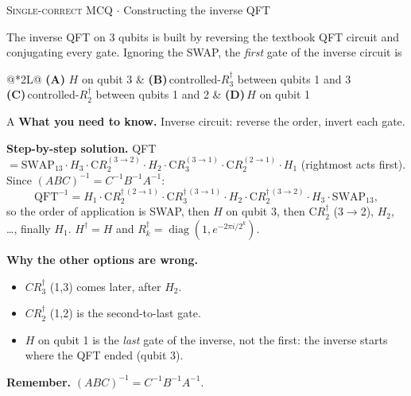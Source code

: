 \documentclass[11pt,a4paper]{article}
\newcommand{\optlabel}[1]{\textbf{(#1)}}
\newcommand{\correctlabel}[1]{\textcolor{okgreen}{\textbf{(#1)}\,\ding{51}}}
\newenvironment{qitem}[1]{\begin{list}{}{\setlength{\leftmargin}{3.3em}\setlength{\labelwidth}{3.1em}%
  \setlength{\labelsep}{0.2em}\setlength{\topsep}{3pt}\setlength{\parsep}{3pt}}\item[\textbf{Q.#1}\hfill]}{\end{list}}
\newcommand{\qsep}{\par\vspace{2pt}{\color{black!15}\hrule}\vspace{4pt}}
\newcommand{\qmeta}[2]{{\footnotesize\color{black!60}\textsc{#1} \;$\cdot$\; #2}\par}
\begin{document}
\begin{qitem}{51}
\qmeta{Single-correct MCQ}{Constructing the inverse QFT}
The inverse QFT on 3 qubits is built by reversing the textbook QFT circuit and conjugating every gate. Ignoring the
SWAP, the \emph{first} gate of the inverse circuit is
\par\smallskip\noindent\begin{tabularx}{\linewidth}{@{}*{2}{L}@{}}
\correctlabel{A}\,$H$ on qubit 3 & \optlabel{B}\,controlled-$R_3^\dagger$ between qubits 1 and 3 \\[3pt]
\optlabel{C}\,controlled-$R_2^\dagger$ between qubits 1 and 2 & \optlabel{D}\,$H$ on qubit 1
\end{tabularx}
\end{qitem}
\begin{solbox}{A}
\textbf{\color{brand}What you need to know.} Inverse circuit: reverse the order, invert each gate.

\textbf{\color{brand}Step-by-step solution.} QFT $= \mathrm{SWAP}_{13}\cdot H_3\cdot \mathrm{C}R_2^{(3\to2)}\cdot H_2\cdot\mathrm{C}R_3^{(3\to1)}\cdot \mathrm{C}R_2^{(2\to1)}\cdot H_1$
(rightmost acts first). Since $(ABC)^{-1} = C^{-1}B^{-1}A^{-1}$:
\[ \mathrm{QFT}^{-1} = H_1\cdot \mathrm{C}R_2^{\dagger\,(2\to1)}\cdot\mathrm{C}R_3^{\dagger\,(3\to1)}\cdot H_2\cdot \mathrm{C}R_2^{\dagger\,(3\to2)}\cdot H_3\cdot \mathrm{SWAP}_{13}, \]
so the order of application is SWAP, then $H$ on qubit 3, then $\mathrm{C}R_2^\dagger$ (3$\to$2), $H_2$, \dots, finally $H_1$.
$H^\dagger = H$ and $R_k^\dagger = \operatorname{diag}(1, e^{-2\pi i/2^k})$.

\textbf{\color{brand}Why the other options are wrong.}
\begin{itemize}[leftmargin=2.4em, itemsep=1pt, topsep=2pt]
\item[\textbf{(B)}] $CR_3^\dagger$ (1,3) comes later, after $H_2$.
\item[\textbf{(C)}] $CR_2^\dagger$ (1,2) is the second-to-last gate.
\item[\textbf{(D)}] $H$ on qubit 1 is the \emph{last} gate of the inverse, not the first: the inverse starts where the QFT ended (qubit 3).
\end{itemize}
\textbf{\color{brand}Remember.} $(ABC)^{-1} = C^{-1}B^{-1}A^{-1}$.
\end{solbox}
\qsep
\end{document}
